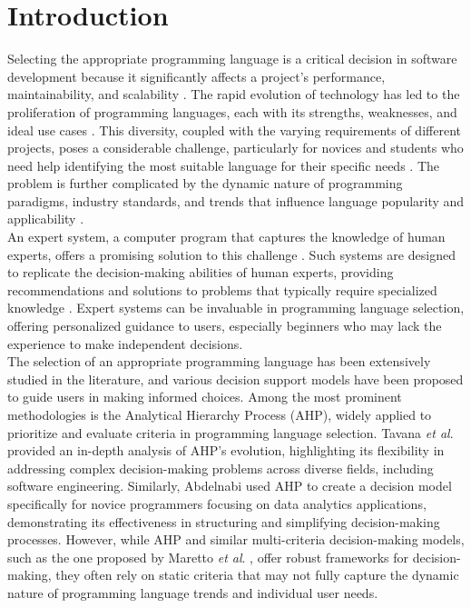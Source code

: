 \documentclass[conference]{IEEEtran}
\begin{document}
\section{Introduction}
Selecting the appropriate programming language is a critical decision in software development because it significantly affects a project’s performance, maintainability, and scalability \cite{Spinellis2006}. The rapid evolution of technology has led to the proliferation of programming languages, each with its strengths, weaknesses, and ideal use cases \cite{Noone2018}. This diversity, coupled with the varying requirements of different projects, poses a considerable challenge, particularly for novices and students who need help identifying the most suitable language for their specific needs \cite{Kelleher2005}. The problem is further complicated by the dynamic nature of programming paradigms, industry standards, and trends that influence language popularity and applicability \cite{Perera2021}. \\
\indent An expert system, a computer program that captures the knowledge of human experts, offers a promising solution to this challenge \cite{Reddy2022}. Such systems are designed to replicate the decision-making abilities of human experts, providing recommendations and solutions to problems that typically require specialized knowledge \cite{Hidayati2021}. Expert systems can be invaluable in programming language selection, offering personalized guidance to users, especially beginners who may lack the experience to make independent decisions. \\
\indent The selection of an appropriate programming language has been extensively studied in the literature, and various decision support models have been proposed to guide users in making informed choices. Among the most prominent methodologies is the Analytical Hierarchy Process (AHP), widely applied to prioritize and evaluate criteria in programming language selection. Tavana \textit {et al}. \cite{Tavana2023} provided an in-depth analysis of AHP’s evolution, highlighting its flexibility in addressing complex decision-making problems across diverse fields, including software engineering. Similarly, Abdelnabi \cite{Abdelnabi2019} used AHP to create a decision model specifically for novice programmers focusing on data analytics applications, demonstrating its effectiveness in structuring and simplifying decision-making processes. However, while AHP and similar multi-criteria decision-making models, such as the one proposed by Maretto \textit {et al}. \cite{Maretto2022}, offer robust frameworks for decision-making, they often rely on static criteria that may not fully capture the dynamic nature of programming language trends and individual user needs. \\
\end{document}
